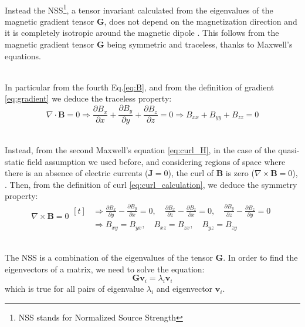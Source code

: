 \documentclass[main]{subfiles}
\begin{document}
\noindent\\
Instead the NSS\footnote{NSS stands for Normalized Source Strength}, a tensor invariant calculated 
from the eigenvalues of the magnetic gradient tensor $\mathbf{G}$, 
does not depend on the magnetization direction and it 
is completely isotropic around the magnetic dipole \cite{multiple_real_plots_invariants}.
This follows from the magnetic gradient tensor $\mathbf{G}$ being symmetric and traceless,
thanks to Maxwell's equations.

\noindent\\
In particular from the fourth Eq.\ref{eq:B}, 
and from the definition of gradient \eqref{eq:gradient} we deduce the traceless property:
\begin{equation}
    \nabla \cdot \mathbf{B} = 0
    \Rightarrow
 \frac{\partial B_x}{\partial x} +\frac{\partial B_y}{\partial y} + \frac{\partial B_z}{\partial z} = 0
    \Rightarrow
 B_{xx} + B_{yy} + B_{zz} = 0
\end{equation}

\noindent\\
Instead, from the second Maxwell's equation \eqref{eq:curl_H}, in the case
of the quasi-static field assumption we used before, and considering regions
of space where there is an absence of electric currents (\(\mathbf{J} = 0\)),
the curl of \(\mathbf{B}\) is zero (\(\nabla \times \mathbf{B} = 0\)), \cite{NSS_single_different_dimensions}.
Then, from the definition of curl \eqref{eq:curl_calculation}, we deduce the symmetry property:
\begin{equation}
    \nabla \times \mathbf{B} = 0
    \begin{aligned}[t]
        &\Rightarrow \frac{\partial B_x}{\partial y} - \frac{\partial B_y}{\partial x} = 0, \quad 
 \frac{\partial B_x}{\partial z} - \frac{\partial B_z}{\partial x} = 0, \quad 
 \frac{\partial B_y}{\partial z} - \frac{\partial B_z}{\partial y} = 0 \\
        &\Rightarrow B_{xy} = B_{yx}, \quad B_{xz} = B_{zx}, \quad B_{yz} = B_{zy}
\end{aligned}
\end{equation}

\noindent\\
The NSS is a combination of the eigenvalues of the tensor \( \mathbf{G} \).
In order to find the eigenvectors of a matrix, we need to solve the equation:
\begin{equation}
\mathbf{G} \mathbf{v}_i = \lambda_i \mathbf{v}_i
\label{eq:eigen}
\end{equation}
which is true for all pairs of eigenvalue \( \lambda_i \) and eigenvector \( \mathbf{v}_i \).
\end{document}
